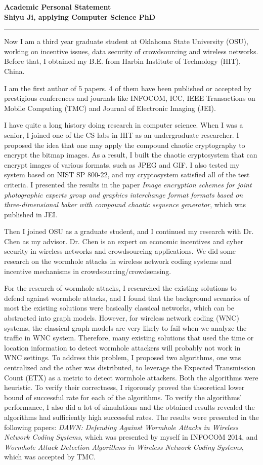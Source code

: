 \documentclass{letter}
\begin{document}
{\bf Academic Personal Statement}\\
{\bf Shiyu Ji, applying Computer Science PhD}\\
\rule{\textwidth}{1pt}

Now I am a third year graduate student at Oklahoma State University (OSU), working on incentive issues, data security of crowdsourcing and wireless networks. Before that, I obtained my B.E. from Harbin Institute of Technology (HIT), China.

I am the first author of 5 papers. 4 of them have been published or accepted by prestigious conferences and journals like INFOCOM, ICC, IEEE Transactions on Mobile Computing (TMC) and Journal of Electronic Imaging (JEI).

I have quite a long history doing research in computer science. When I was a senior, I joined one of the CS labs in HIT as an undergraduate researcher. I proposed the idea that one may apply the compound chaotic cryptography to encrypt the bitmap images. As a result, I built the chaotic cryptosystem that can encrypt images of various formats, such as JPEG and GIF. I also tested my system based on NIST SP 800-22, and my cryptosystem satisfied all of the test criteria. I presented the results in the paper \emph{Image encryption schemes for joint photographic experts group and graphics interchange format formats based on three-dimensional baker with compound chaotic sequence generator}, which was published in JEI.

Then I joined OSU as a graduate student, and I continued my research with Dr. Chen as my advisor. Dr. Chen is an expert on economic incentives and cyber security in wireless networks and crowdsourcing applications. We did some research on the wormhole attacks in wireless network coding systems and incentive mechanisms in crowdsourcing/crowdsensing.

For the research of wormhole attacks, I researched the existing solutions to defend against wormhole attacks, and I found that the background scenarios of most the existing solutions were basically classical networks, which can be abstracted into graph models. However, for wireless network coding (WNC) systems, the classical graph models are very likely to fail when we analyze the traffic in WNC system. Therefore, many existing solutions that used the time or location information to detect wormhole attackers will probably not work in WNC settings. To address this problem, I proposed two algorithms, one was centralized and the other was distributed, to leverage the Expected Transmission Count (ETX) as a metric to detect wormhole attackers. Both the algorithms were heuristic. To verify their correctness, I rigorously proved the theoretical lower bound of successful rate for each of the algorithms. To verify the algorithms' performance, I also did a lot of simulations and the obtained results revealed the algorithms had sufficiently high successful rates. The results were presented in the following papers: \emph{DAWN: Defending Against Wormhole Attacks in Wireless Network Coding Systems}, which was presented by myself in INFOCOM 2014, and \emph{Wormhole Attack Detection Algorithms in Wireless Network Coding Systems}, which was accepted by TMC.
\end{document}
